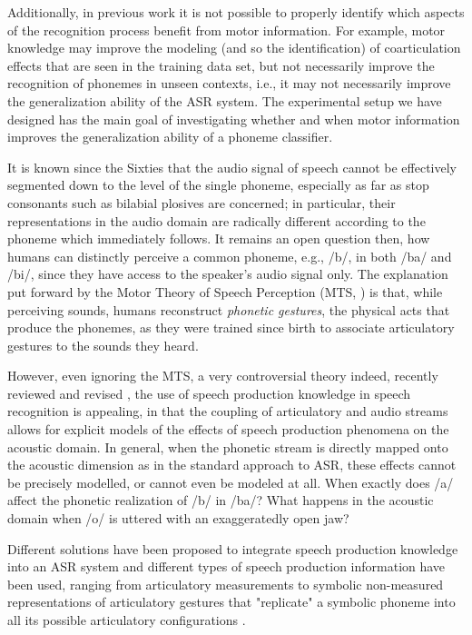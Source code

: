 \documentclass[10pt]{article}
\begin{document}
Additionally, in previous work it is not possible to properly identify which aspects of the
recognition process benefit from motor information. For example, motor knowledge may improve
the modeling (and so the identification) of coarticulation effects that are seen in the training
data set, but not necessarily improve the recognition of phonemes in unseen contexts, i.e., it
may not necessarily improve the generalization ability of the ASR system. The
experimental setup we have designed has the main goal of investigating whether and when motor information
improves the generalization ability of a phoneme classifier.

It is known since the Sixties \cite{liberman1} that the audio signal of speech
cannot be effectively segmented down to the level of the single phoneme,
especially as far as stop consonants such as bilabial plosives
are concerned; in particular, their representations in the audio domain are
radically different according to the phoneme which immediately follows.
It remains an open question then, how humans can distinctly perceive a common
phoneme, e.g., /b/, in both /ba/ and /bi/, since they have access to the speaker's
audio signal only. The explanation put forward by the Motor Theory of Speech Perception
(MTS, \cite{liberman2}) is that, while perceiving sounds, humans reconstruct
\emph{phonetic gestures}, the physical acts that produce the phonemes, as they were
trained since birth to associate articulatory gestures to the sounds they heard.

However, even ignoring the MTS, a very controversial theory indeed, recently reviewed and
revised \cite{galant,massaro}, the use of speech production knowledge in speech recognition
is appealing, in that the coupling of articulatory and audio streams allows for explicit models
of the effects of speech production phenomena on the acoustic domain.
In general, when the phonetic stream is directly mapped onto the acoustic dimension as in the standard
approach to ASR, these effects cannot be precisely modelled, or cannot even be modeled at all.
When exactly does /a/ affect the phonetic realization of /b/ in /ba/?
What happens in the acoustic domain when /o/ is uttered with an exaggeratedly open jaw?

Different solutions have been proposed to integrate speech production knowledge into an ASR system
and different types of speech production information have been used, ranging from articulatory
measurements \cite{zlokarnik,stephenson,wrench} to symbolic non-measured representations of
articulatory gestures that "replicate" a symbolic phoneme into all its possible articulatory
configurations \cite{richardson, livescu}.   
\end{document}
